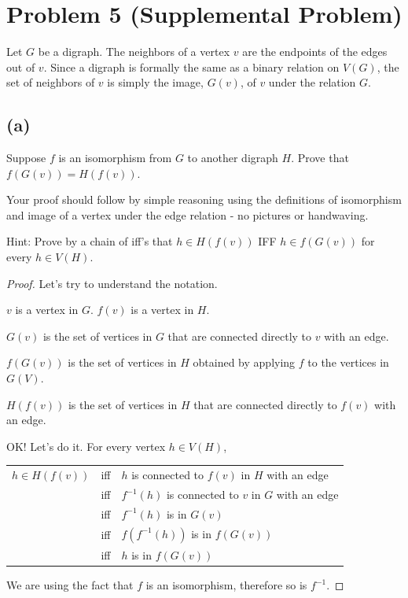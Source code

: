 \documentclass[14pt]{extarticle}
\begin{document}
\section{Problem 5 (Supplemental Problem)}
Let $G$ be a digraph. The neighbors of a vertex $v$ are the endpoints of the edges out of $v$. Since a digraph is formally the same as a binary relation on $V(G)$, the set of neighbors of $v$ is simply the image, $G(v)$, of $v$ under the relation $G$.

\subsection{(a)}
Suppose $f$ is an isomorphism from $G$ to another digraph $H$. Prove that $f(G(v)) = H(f(v))$.

Your proof should follow by simple reasoning using the definitions of isomorphism and image of a vertex under the edge relation - no pictures or handwaving.

Hint: Prove by a chain of iff’s that $h \in H(f(v))$ IFF $h \in f (G(v))$ for every $h \in V(H)$.
\begin{proof}
Let's try to understand the notation.

$v$ is a vertex in $G$. $f(v)$ is a vertex in $H$.

$G(v)$ is the set of vertices in $G$ that are connected directly to $v$ with an edge.

$f(G(v))$ is the set of vertices in $H$ obtained by applying $f$ to the vertices in $G(V)$.

$H(f(v))$ is the set of vertices in $H$ that are connected directly to $f(v)$ with an edge.

OK! Let's do it. For every vertex $h \in V(H)$, 

\begin{tabular}{ccl}
$h \in H(f(v))$ & iff & $h$ is connected to $f(v)$ in $H$ with an edge \\
& iff & $f^{-1}(h)$ is connected to $v$ in $G$ with an edge \\
& iff & $f^{-1}(h)$ is in $G(v)$ \\
& iff & $f(f^{-1}(h))$ is in $f(G(v))$\\
& iff & $h$ is in $f(G(v))$ 
\end{tabular}

We are using the fact that $f$ is an isomorphism, therefore so is $f^{-1}$.
\end{proof}
\end{document}
